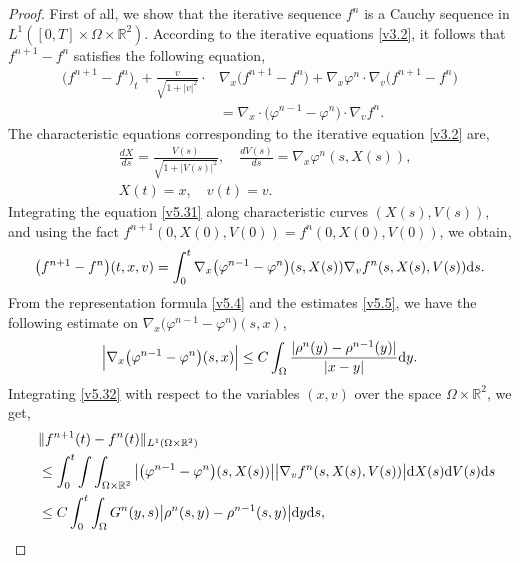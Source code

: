 \documentclass[11pt,reqno]{amsart}%
\theoremstyle{definition}
\theoremstyle{remark}
\begin{document}
\begin{proof}
First of all, we show that the iterative sequence $f^{n}$ is a Cauchy sequence in $L^{1}([0,T]\times\Omega\times\mathbb{R}^{2})$.
According to the iterative equations \eqref{v3.2}, it follows that $f^{n+1}-f^{n}$ satisfies the following equation,
\begin{align}
\big(f^{n+1}-f^{n}\big)_{t}+\frac{v}{\sqrt{1+|v|^{2}}}\cdot &\nabla_{x}\big(f^{n+1}-f^{n}\big)+\nabla_{x}\varphi^{n}\cdot\nabla_{v}\big(f^{n+1}-f^{n}\big)\nonumber\\
&=\nabla_{x}\cdot \big(\varphi^{n-1}-\varphi^{n}\big)\cdot \nabla_{v}f^{n}.\label{v5.31}
\end{align}
The characteristic  equations corresponding to the iterative equation \eqref{v3.2} are,
\begin{align}
&\frac{d X}{d s}=\frac{V(s)}{\sqrt{1+|V(s)|^{2}}},\quad \frac{d V(s)}{d s}=\nabla_{x}\varphi^{n}(s,X(s)),\nonumber\\
&X(t)=x,\quad v(t)=v.\nonumber
\end{align}
Integrating the equation \eqref{v5.31} along characteristic curves $(X(s),V(s))$, and using the fact $f^{n+1}(0,X(0),V(0))=f^{n}(0,X(0),V(0))$,  we obtain,
\begin{align}
\big(f^{n+1}-f^{n}\big)(t,x,v)=\int^{t}_{0}\nabla_{x} \big(\varphi^{n-1}-\varphi^{n}\big)(s,X(s)) \nabla_{v}f^{n}(s,X(s),V(s)){\rm d} s. \label{v5.32}
\end{align}
From the representation formula \eqref{v5.4} and the estimates \eqref{v5.5}, we have the following estimate on $\nabla_{x}\big(\varphi^{n-1}-\varphi^{n}\big)(s,x)$,
\begin{align}
\Big|\nabla_{x}\big(\varphi^{n-1}-\varphi^{n}\big)(s,x)\Big|\leq C\int_{\Omega}\frac{|\rho^{n}(y)-\rho^{n-1}(y)|}{|x-y|}{\rm d} y.\nonumber
\end{align}
Integrating \eqref{v5.32} with respect to the  variables $(x,v)$ over the space $\Omega\times\mathbb{R}^{2}$, we get,
\begin{align}
&\|f^{n+1}(t)-f^{n}(t)\|_{L^{1}(\Omega\times \mathbb{R}^{2})}\nonumber\\
\quad &\leq \int^{t}_{0}\int\int_{\Omega\times \mathbb{R}^{2}}\big|\big(\varphi^{n-1}-\varphi^{n}\big)(s,X(s))\big|\big|\nabla_{v}f^{n}(s,X(s),V(s))\big|
{\rm d} X(s){\rm d} V(s){\rm d} s\nonumber\\
\quad &\leq C  \int^{t}_{0}\int_{\Omega}G^{n}(y,s)\big|\rho^{n}(s,y)-\rho^{n-1}(s,y)\big|{\rm d} y{\rm d} s,\nonumber
\end{align}

\end{proof}
\end{document}
